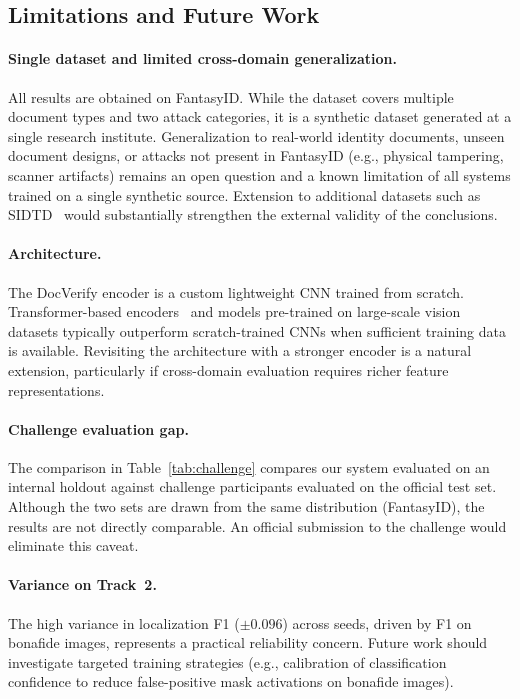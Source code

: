 \subsection{Limitations and Future Work}

\paragraph{Single dataset and limited cross-domain generalization.}
All results are obtained on FantasyID. While the dataset covers multiple document
types and two attack categories, it is a synthetic dataset generated at a single
research institute. Generalization to real-world identity documents, unseen
document designs, or attacks not present in FantasyID (e.g., physical tampering,
scanner artifacts) remains an open question and a known limitation of all systems
trained on a single synthetic source. Extension to additional datasets such as
SIDTD~\cite{sidtd2024} would substantially strengthen the external validity
of the conclusions.

\paragraph{Architecture.}
The DocVerify encoder is a custom lightweight CNN trained from scratch. Transformer-based
encoders~\cite{dosovitskiy2021vit} and models pre-trained on large-scale vision datasets
typically outperform scratch-trained CNNs when sufficient training data is
available. Revisiting the architecture with a stronger encoder is a natural
extension, particularly if cross-domain evaluation requires richer feature representations.

\paragraph{Challenge evaluation gap.}
The comparison in Table~\ref{tab:challenge} compares our system evaluated on an
internal holdout against challenge participants evaluated on the official test set.
Although the two sets are drawn from the same distribution (FantasyID), the results
are not directly comparable. An official submission to the challenge would
eliminate this caveat.

\paragraph{Variance on Track~2.}
The high variance in localization F1 ($\pm 0.096$) across seeds, driven by F1 on
bonafide images, represents a practical reliability concern. Future work should
investigate targeted training strategies (e.g., calibration of classification
confidence to reduce false-positive mask activations on bonafide images).
